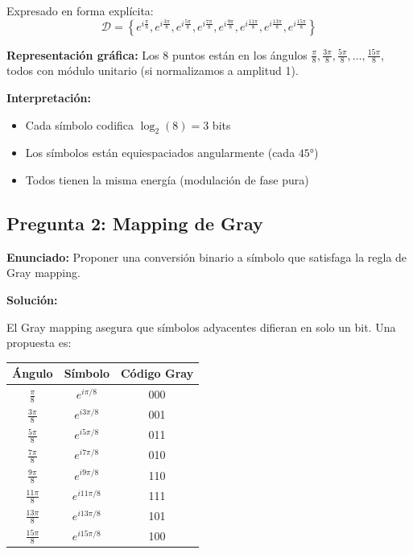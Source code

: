\documentclass[11pt,a4paper]{article}
\begin{document}
Expresado en forma expl\'icita:
\[
\mathcal{D} = \left\{e^{i\frac{\pi}{8}}, e^{i\frac{3\pi}{8}}, e^{i\frac{5\pi}{8}}, e^{i\frac{7\pi}{8}}, e^{i\frac{9\pi}{8}}, e^{i\frac{11\pi}{8}}, e^{i\frac{13\pi}{8}}, e^{i\frac{15\pi}{8}}\right\}
\]

\textbf{Representaci\'on gr\'afica:} Los 8 puntos est\'an en los \'angulos $\frac{\pi}{8}, \frac{3\pi}{8}, \frac{5\pi}{8}, \ldots, \frac{15\pi}{8}$, todos con m\'odulo unitario (si normalizamos a amplitud 1).

\textbf{Interpretaci\'on:}
\begin{itemize}
    \item Cada s\'imbolo codifica $\log_2(8) = 3$ bits
    \item Los s\'imbolos est\'an equiespaciados angularmente (cada $45°$)
    \item Todos tienen la misma energ\'ia (modulaci\'on de fase pura)
\end{itemize}



\subsection*{Pregunta 2: Mapping de Gray}

\textbf{Enunciado:} Proponer una conversi\'on binario a s\'imbolo que satisfaga la regla de Gray mapping.

\vspace{0.3cm}
\textbf{Soluci\'on:}

El Gray mapping asegura que s\'imbolos adyacentes difieran en solo un bit. Una propuesta es:

\begin{center}
\begin{tabular}{|c|c|c|}
\hline
\textbf{\'Angulo} & \textbf{S\'imbolo} & \textbf{C\'odigo Gray} \\
\hline
$\frac{\pi}{8}$ & $e^{i\pi/8}$ & 000 \\
$\frac{3\pi}{8}$ & $e^{i3\pi/8}$ & 001 \\
$\frac{5\pi}{8}$ & $e^{i5\pi/8}$ & 011 \\
$\frac{7\pi}{8}$ & $e^{i7\pi/8}$ & 010 \\
$\frac{9\pi}{8}$ & $e^{i9\pi/8}$ & 110 \\
$\frac{11\pi}{8}$ & $e^{i11\pi/8}$ & 111 \\
$\frac{13\pi}{8}$ & $e^{i13\pi/8}$ & 101 \\
$\frac{15\pi}{8}$ & $e^{i15\pi/8}$ & 100 \\
\hline
\end{tabular}
\end{center}
\end{document}
